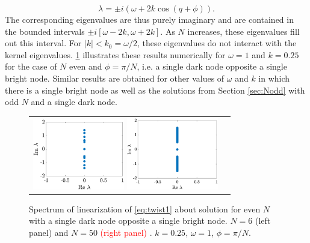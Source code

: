 \documentclass[reprint, amsmath,amssymb,aps,pra]{revtex4-2}
\renewcommand{\revised}[1]{ \textcolor{red}{#1} }
\begin{document}
\begin{equation}\label{eq:dispersion}
\lambda = \pm i \left( \omega + 2 k \cos(q + \phi) \right).
\end{equation}
The corresponding eigenvalues are thus purely imaginary and are contained in the bounded intervals $\pm i[\omega - 2 k, \omega + 2 k]$. As $N$ increases, these eigenvalues fill out this interval. For $|k| < k_0 = \omega/2$, these eigenvalues do not interact with the kernel eigenvalues. \cref{fig:evenholespec} illustrates these results numerically for $\omega = 1$ and $k = 0.25$ for the case of $N$ even and $\phi = \pi/N$, i.e. a single dark node opposite a single bright node. Similar results are obtained for other values of $\omega$ and $k$ in which there is a single bright node as well as the solutions from Section \ref{sec:Nodd} with odd $N$ and a single dark node.
\begin{figure}
\begin{center}
\begin{tabular}{cc}
\includegraphics[width=4cm]{evenhole6spec.eps}
\includegraphics[width=4cm]{evenhole50spec.eps}
\end{tabular}
\end{center}
\caption{Spectrum of linearization of \cref{eq:twist1} about solution for even $N$ with a single dark node opposite a single bright node. $N=6$ (left panel) and $N=50$ \revised{(right panel)}. $k=0.25$, $\omega = 1$, $\phi = \pi/N$.}
\label{fig:evenholespec}
\end{figure}
\end{document}
